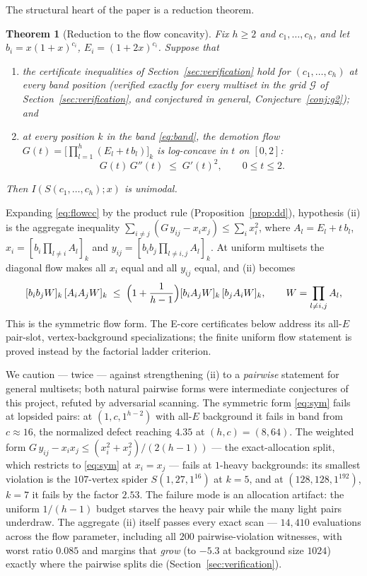 \documentclass[11pt]{article}
\newtheorem{theorem}{Theorem}[section]
\theoremstyle{definition}
\begin{document}
The structural heart of the paper is a reduction theorem.

\begin{theorem}[Reduction to the flow concavity]\label{thm:reduction}
Fix $h\ge 2$ and $c_1,\dots,c_h$, and let $b_i=x(1+x)^{c_i}$,
$E_i=(1+2x)^{c_i}$.  Suppose that
\begin{enumerate}
\item[(i)] the certificate inequalities of
  Section~\ref{sec:verification} hold for $(c_1,\dots,c_h)$ at every
  band position (verified exactly for every multiset in the grid
  $\mathcal G$ of Section~\ref{sec:verification}, and conjectured in
  general, Conjecture~\ref{conj:g2}); and
\item[(ii)] at every position $k$ in the band \eqref{eq:band}, the
  demotion flow $G(t)=\bigl[\prod_{l=1}^h(E_l+t\,b_l)\bigr]_k$ is
  log-concave in $t$ on $[0,2]$:
\begin{equation}\label{eq:flowcc}
  G(t)\,G''(t)\;\le\;G'(t)^2 ,\qquad 0\le t\le 2 .
\end{equation}
\end{enumerate}
Then $I(S(c_1,\dots,c_h);x)$ is unimodal.
\end{theorem}

Expanding \eqref{eq:flowcc} by the product rule
(Proposition~\ref{prop:dd}), hypothesis (ii) is the aggregate
inequality $\sum_{i\ne j}(G\,y_{ij}-x_ix_j)\le\sum_ix_i^2$, where
$A_l=E_l+t\,b_l$, $x_i=[b_i\prod_{l\ne i}A_l]_k$ and
$y_{ij}=[b_ib_j\prod_{l\ne i,j}A_l]_k$.  At uniform multisets the
diagonal flow makes all $x_i$ equal and all $y_{ij}$ equal, and (ii)
becomes
\begin{equation}\label{eq:sym}
  [b_ib_jW]_k\,[A_iA_jW]_k\;\le\;
  \Bigl(1+\frac1{h-1}\Bigr)[b_iA_jW]_k\,[b_jA_iW]_k,
  \qquad W=\prod_{l\ne i,j}A_l,
\end{equation}
This is the symmetric flow form.  The E-core certificates below address
its all-$E$ pair-slot, vertex-background specializations; the finite
uniform flow statement is proved instead by the factorial ladder
criterion.

We caution --- twice --- against strengthening (ii) to a
\emph{pairwise} statement for general multisets; both natural
pairwise forms were intermediate conjectures of this project,
refuted by adversarial scanning.  The symmetric form \eqref{eq:sym}
fails at lopsided pairs: at $(1,c,1^{h-2})$ with all-$E$ background
it fails in band from $c\approx16$, the normalized defect reaching
$4.35$ at $(h,c)=(8,64)$.  The weighted form
$G\,y_{ij}-x_ix_j\le(x_i^2+x_j^2)/(2(h-1))$ --- the exact-allocation
split, which restricts to \eqref{eq:sym} at $x_i=x_j$ --- fails at
$1$-heavy backgrounds: its smallest violation is the $107$-vertex
spider $S(1,27,1^{16})$ at $k=5$, and at $(128,128,1^{192})$, $k=7$
it fails by the factor $2.53$.  The failure mode is an allocation
artifact: the uniform $1/(h-1)$ budget starves the heavy pair while
the many light pairs underdraw.  The aggregate (ii) itself passes
every exact scan --- $14{,}410$ evaluations across the flow
parameter, including all $200$ pairwise-violation witnesses, with
worst ratio $0.085$ and margins that \emph{grow} (to $-5.3$ at
background size $1024$) exactly where the pairwise splits die
(Section~\ref{sec:verification}).
\end{document}
